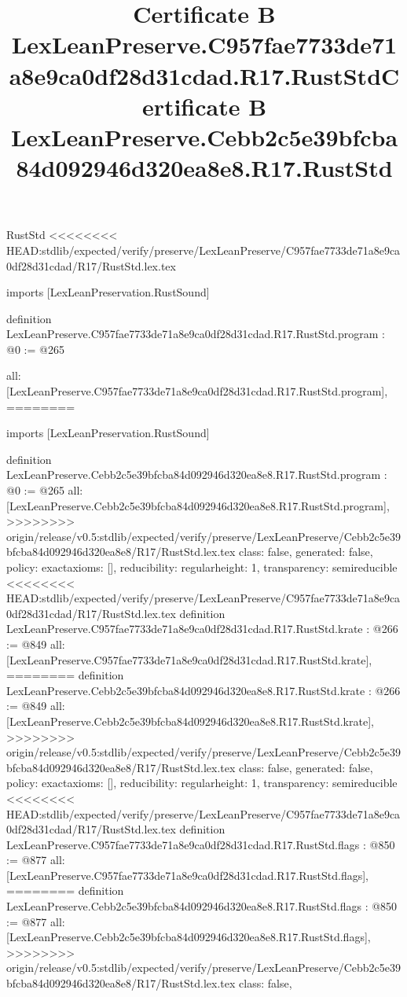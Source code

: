 \begin{lexlean}{RustStd}
<<<<<<<< HEAD:stdlib/expected/verify/preserve/LexLeanPreserve/C957fae7733de71a8e9ca0df28d31cdad/R17/RustStd.lex.tex
\title{Certificate B LexLeanPreserve.C957fae7733de71a8e9ca0df28d31cdad.R17.RustStd}
\begin{coremodule}
imports [LexLeanPreservation.RustSound]

definition LexLeanPreserve.C957fae7733de71a8e9ca0df28d31cdad.R17.RustStd.program : @0 := @265 {
  all: [LexLeanPreserve.C957fae7733de71a8e9ca0df28d31cdad.R17.RustStd.program],
========
\title{Certificate B LexLeanPreserve.Cebb2c5e39bfcba84d092946d320ea8e8.R17.RustStd}
\begin{coremodule}
imports [LexLeanPreservation.RustSound]

definition LexLeanPreserve.Cebb2c5e39bfcba84d092946d320ea8e8.R17.RustStd.program : @0 := @265 {
  all: [LexLeanPreserve.Cebb2c5e39bfcba84d092946d320ea8e8.R17.RustStd.program],
>>>>>>>> origin/release/v0.5:stdlib/expected/verify/preserve/LexLeanPreserve/Cebb2c5e39bfcba84d092946d320ea8e8/R17/RustStd.lex.tex
  class: false,
  generated: false,
  policy: exact{axioms: []},
  reducibility: regular{height: 1},
  transparency: semireducible
}
<<<<<<<< HEAD:stdlib/expected/verify/preserve/LexLeanPreserve/C957fae7733de71a8e9ca0df28d31cdad/R17/RustStd.lex.tex
definition LexLeanPreserve.C957fae7733de71a8e9ca0df28d31cdad.R17.RustStd.krate : @266 := @849 {
  all: [LexLeanPreserve.C957fae7733de71a8e9ca0df28d31cdad.R17.RustStd.krate],
========
definition LexLeanPreserve.Cebb2c5e39bfcba84d092946d320ea8e8.R17.RustStd.krate : @266 := @849 {
  all: [LexLeanPreserve.Cebb2c5e39bfcba84d092946d320ea8e8.R17.RustStd.krate],
>>>>>>>> origin/release/v0.5:stdlib/expected/verify/preserve/LexLeanPreserve/Cebb2c5e39bfcba84d092946d320ea8e8/R17/RustStd.lex.tex
  class: false,
  generated: false,
  policy: exact{axioms: []},
  reducibility: regular{height: 1},
  transparency: semireducible
}
<<<<<<<< HEAD:stdlib/expected/verify/preserve/LexLeanPreserve/C957fae7733de71a8e9ca0df28d31cdad/R17/RustStd.lex.tex
definition LexLeanPreserve.C957fae7733de71a8e9ca0df28d31cdad.R17.RustStd.flags : @850 := @877 {
  all: [LexLeanPreserve.C957fae7733de71a8e9ca0df28d31cdad.R17.RustStd.flags],
========
definition LexLeanPreserve.Cebb2c5e39bfcba84d092946d320ea8e8.R17.RustStd.flags : @850 := @877 {
  all: [LexLeanPreserve.Cebb2c5e39bfcba84d092946d320ea8e8.R17.RustStd.flags],
>>>>>>>> origin/release/v0.5:stdlib/expected/verify/preserve/LexLeanPreserve/Cebb2c5e39bfcba84d092946d320ea8e8/R17/RustStd.lex.tex
  class: false,
}}}
\end{coremodule}}
\end{coremodule}
\end{lexlean}
